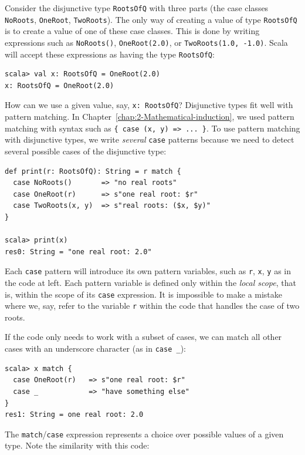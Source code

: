 Consider the disjunctive type \lstinline!RootsOfQ! with three parts
(the case classes \lstinline!NoRoots!, \lstinline!OneRoot!, \lstinline!TwoRoots!).
The only way of creating a value of type \lstinline!RootsOfQ! is
to create a value of one of these case classes. This is done by writing
expressions such as \lstinline!NoRoots()!, \lstinline!OneRoot(2.0)!,
or \lstinline!TwoRoots(1.0, -1.0)!. Scala will accept these expressions
as having the type \lstinline!RootsOfQ!:
\begin{lstlisting}
scala> val x: RootsOfQ = OneRoot(2.0)
x: RootsOfQ = OneRoot(2.0)
\end{lstlisting}

How can we use a given value, say, \lstinline!x: RootsOfQ!? Disjunctive
types fit well with pattern matching. In Chapter~\ref{chap:2-Mathematical-induction},
we used pattern matching with syntax such as \lstinline!{ case (x, y) => ... }!.
To use pattern matching with disjunctive types, we write \emph{several}
\lstinline!case! patterns because we need to detect several possible
cases of the disjunctive type:
\begin{lstlisting}
def print(r: RootsOfQ): String = r match {
  case NoRoots()       => "no real roots"
  case OneRoot(r)      => s"one real root: $r"
  case TwoRoots(x, y)  => s"real roots: ($x, $y)"
}

scala> print(x)
res0: String = "one real root: 2.0"
\end{lstlisting}
Each \lstinline!case! pattern will introduce its own pattern variables,
such as \lstinline!r!, \lstinline!x!, \lstinline!y! as in the code
at left. Each pattern variable is defined only within the \emph{local
scope}, that is, within the scope of its \lstinline!case!
expression. It is impossible to make a mistake where we, say, refer
to the variable \lstinline!r! within the code that handles the case
of two roots.

If the code only needs to work with a subset of cases, we can match
all other cases with an underscore character (as in \lstinline!case _!):
\begin{lstlisting}
scala> x match {
  case OneRoot(r)   => s"one real root: $r"
  case _            => "have something else"
}
res1: String = one real root: 2.0
\end{lstlisting}
The \lstinline!match!/\lstinline!case! expression represents a choice
over possible values of a given type. Note the similarity with this
code:

